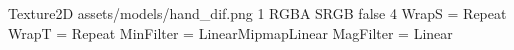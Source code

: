 Texture2D
assets/models/hand_dif.png
1
RGBA
SRGB
false
4
WrapS = Repeat
WrapT = Repeat
MinFilter = LinearMipmapLinear
MagFilter = Linear
